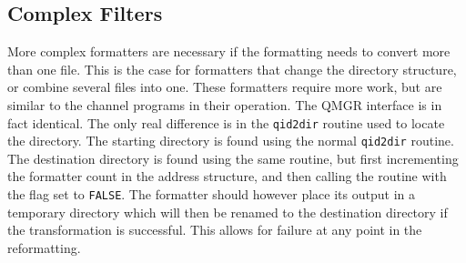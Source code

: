 \subsection{Complex Filters}

More complex formatters are necessary if the formatting needs to
convert more than one file. This is the case for formatters that change
the directory structure, or combine several files into one. These
formatters require more work, but are similar to the channel programs
in their operation. The QMGR interface is in fact identical.
The only real difference is in the \verb|qid2dir|
routine used to locate the directory. The starting directory is found
using the normal \verb|qid2dir| routine. The destination directory is
found using the same routine, but first incrementing the formatter
count in the address structure, and then calling the routine with the
flag set to \verb|FALSE|. The formatter should however place its
output in a temporary directory which will then be renamed to the
destination directory if the transformation is successful. This allows
for failure at any point in the reformatting.





